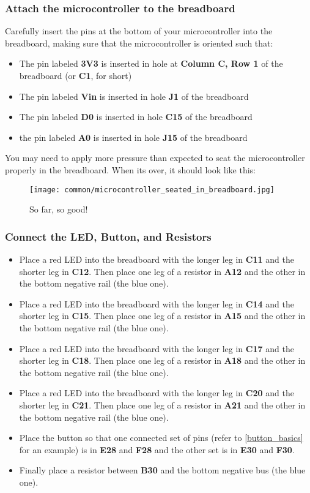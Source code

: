 \subsubsection{Attach the microcontroller to the breadboard}
Carefully insert the pins at the bottom of your microcontroller into the breadboard, making sure that the microcontroller is oriented such that:
\begin{itemize}
    \item The pin labeled \textbf{3V3} is inserted in hole at \textbf{Column C, Row 1} of the breadboard (or \textbf{C1}, for short)
    \item The pin labeled \textbf{Vin} is inserted in hole \textbf{J1} of the breadboard
    \item The pin labeled \textbf{D0} is inserted in hole \textbf{C15} of the breadboard
    \item the pin labeled \textbf{A0} is inserted in hole \textbf{J15} of the breadboard
\end{itemize}
You may need to apply more pressure than expected to seat the microcontroller properly in the breadboard. When its over, it should look like this:

\begin{figure}[H]
    \centering
    \texttt{[image: common/microcontroller\_seated\_in\_breadboard.jpg]}
    \caption{So far, so good!}
\end{figure}

\subsubsection{Connect the LED, Button, and Resistors}
\begin{itemize}
    \item Place a red LED into the breadboard with the longer leg in \textbf{C11} and the shorter leg
    in \textbf{C12}. Then place one leg of a resistor in \textbf{A12} and the other in the bottom
    negative rail (the blue one).
    \item Place a red LED into the breadboard with the longer leg in \textbf{C14} and the shorter leg
    in \textbf{C15}. Then place one leg of a resistor in \textbf{A15} and the other in the bottom
    negative rail (the blue one).
    \item Place a red LED into the breadboard with the longer leg in \textbf{C17} and the shorter leg
    in \textbf{C18}. Then place one leg of a resistor in \textbf{A18} and the other in the bottom
    negative rail (the blue one).
    \item Place a red LED into the breadboard with the longer leg in \textbf{C20} and the shorter leg
    in \textbf{C21}. Then place one leg of a resistor in \textbf{A21} and the other in the bottom
    negative rail (the blue one).
    \item Place the button so that one connected set of pins (refer to \ref{button_basics} for an example) is in \textbf{E28}
    and \textbf{F28} and the other set is in \textbf{E30} and \textbf{F30}.
    \item Finally place a resistor between \textbf{B30} and the bottom negative bus (the blue one).
\end{itemize}

